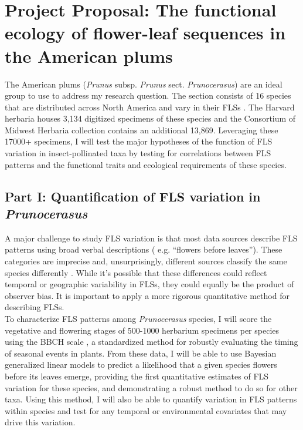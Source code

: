 \documentclass[11pt]{article}
\begin{document}
\section*{Project Proposal: The functional ecology of flower-leaf sequences in the American plums}
The American plums (\textit{Prunus} subsp. \textit{Prunus} sect. \textit{Prunocerasus}) are an ideal group to use to address my research question. The section consists of 16 species that are distributed across North America and vary in their FLSs \citep{Shaw:2004aa}. The Harvard herbaria houses 3,134 digitized specimens of these species and the Consortium of Midwest Herbaria collection contains an additional 13,869. Leveraging these 17000+ specimens, I will test the major hypotheses of the function of FLS variation in insect-pollinated taxa by testing for correlations between FLS patterns and the functional traits and ecological requirements of these species.
\subsection*{Part I: Quantification of FLS variation in \textit{Prunocerasus}}
A major challenge to study FLS variation is that most data sources describe FLS patterns using broad verbal descriptions ( e.g. ``flowers before leaves”). These categories are imprecise and, unsurprisingly, different sources classify the same species differently \citep{Buonaiuto2020}. While it’s possible that these differences could reflect temporal or geographic variability in FLSs, they could equally be the product of observer bias. It is important to apply a more rigorous quantitative method for describing FLSs.\\

To characterize FLS patterns among \textit{Prunocerasus} species, I will score the vegetative and flowering stages of 500-1000 herbarium specimens per species using the BBCH scale \citep{Finn2007}, a standardized method for robustly evaluating the timing of seasonal events in plants. From these data, I will be able to use Bayesian generalized linear models to predict a likelihood that a given species flowers before its leaves emerge, providing the first quantitative estimates of FLS variation for these species, and demonstrating a robust method to do so for other taxa. Using this method, I will also be able to quantify variation in FLS patterns within species and test for any temporal or environmental covariates that may drive this variation.
\end{document}
